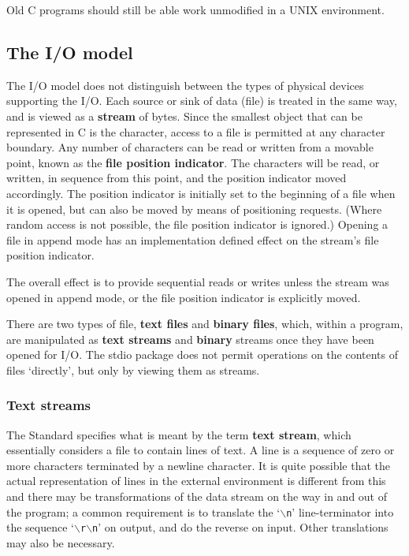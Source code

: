    Old C programs should still be able work unmodified in a
    UNIX environment.


  

  \subsection{The I/O model}
   

   The I/O model does not distinguish between the types of physical devices
    supporting the I/O.  Each source or sink of data (file) is treated in the
    same way, and is viewed as a \textbf{stream} of bytes.  Since the
    smallest object that can be represented in C is the character, access to
    a file is permitted at any character boundary. Any number of characters can
    be read or written from a movable point, known as the \textbf{file position
    indicator}.  The characters will be read, or written, in sequence from
    this point, and the position indicator moved accordingly.  The position
    indicator is initially set to the beginning of a file when it is opened,
    but can also be moved by means of positioning requests.  (Where random
    access is not possible, the file position indicator is ignored.) Opening
    a file in append mode has an implementation defined effect on the stream's
    file position indicator.


   The overall effect is to provide sequential reads or writes unless the
    stream was opened in append mode, or the file position indicator is
    explicitly moved.


   There are two types of file, \textbf{text files} and \textbf{binary
    files}, which, within a program, are manipulated as \textbf{text
    streams} and \textbf{binary} streams once they have been opened for
    I/O.  The stdio package does not permit operations on the contents of files
    `directly', but only by viewing them as streams.


   \subsubsection{Text streams}
    

    The Standard specifies what is meant by the term \textbf{text stream},
     which essentially considers a file to contain lines of text.  A line is
     a sequence of zero or more characters terminated by a newline character.
     It is quite possible that the actual representation of lines in the
     external environment is different from this and there may be
     transformations of the data stream on the way in and out of the program;
     a common requirement is to translate the `\texttt{$\backslash$n}'
     line-terminator into the sequence `\texttt{$\backslash$r$\backslash$n}' on output, and
     do the reverse on input.  Other translations may also be necessary.



